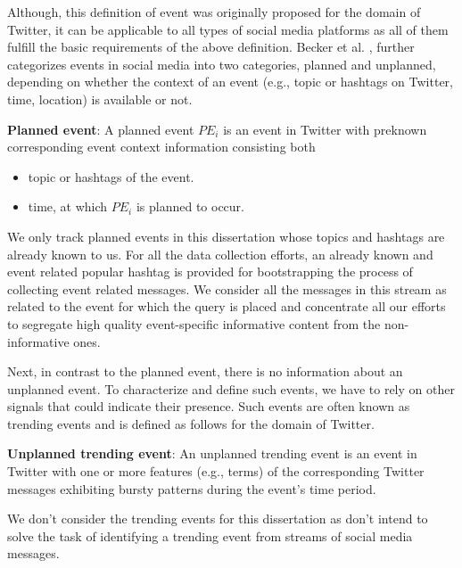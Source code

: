 Although, this definition of event was originally proposed for the domain of Twitter, it can be applicable to all types of social media platforms as all of them fulfill the basic requirements of the above definition. Becker et al. \cite{becker2011beyond}, further categorizes events in social media into two categories, planned and unplanned, depending on whether the context of an event (e.g., topic or hashtags on Twitter, time, location) is available or not.




\textbf{Planned event}: A planned event $PE_{i}$ is an event in Twitter with preknown corresponding event context information consisting both 
\begin{itemize}
\item topic or hashtags of the event.
\item time, at which $PE_{i}$ is planned to occur.
\end{itemize}

We only track planned events in this dissertation whose topics and hashtags are already known to us. For all the data collection efforts, an already known and event related popular hashtag is provided for bootstrapping the process of collecting event related messages. We consider all the messages in this stream as related to the event for which the query is placed and concentrate all our efforts to segregate high quality event-specific informative content from the non-informative ones. 


Next, in contrast to the planned event, there is no information about an unplanned event. To characterize and define such events, we have to rely on other signals that could indicate their presence. Such events are often known as trending events and is defined as follows for the domain of Twitter.

\textbf{Unplanned trending event}: An unplanned trending event is an event in Twitter with one or more features (e.g., terms) of the corresponding Twitter messages exhibiting bursty patterns during the event's time period.

We don't consider the trending events for this dissertation as don't intend to solve the task of identifying a trending event from streams of social media messages.



